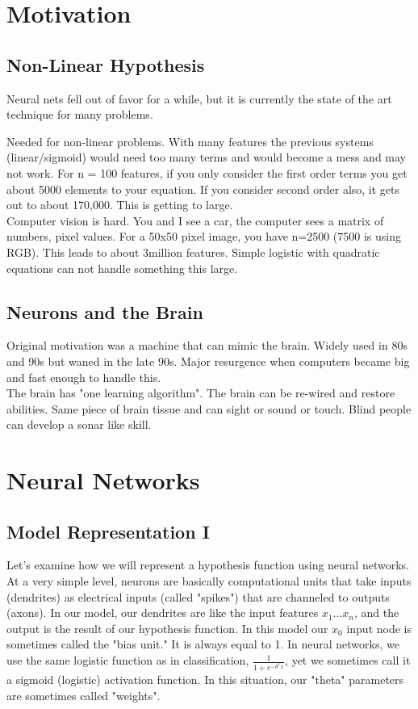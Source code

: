 \section{Motivation}

\subsection{Non-Linear Hypothesis}
Neural nets fell out of favor for a while, but it is currently the state of the art technique for many problems.

Needed for non-linear problems.  With many features the previous systems (linear/sigmoid) would need too many terms and would become a mess and may not work.  For n = 100 features, if you only consider the first order terms you get about 5000 elements to your equation.  If you consider second order also, it gets out to about 170,000.  This is getting to large.\\

Computer vision is hard.  You and I see a car, the computer sees a matrix of numbers, pixel values.  For a 50x50 pixel image, you have n=2500 (7500 is using RGB).  This leads to about 3million features.  Simple logistic with quadratic equations can not handle something this large.\\

\subsection{Neurons and the Brain}
Original motivation was a machine that can mimic the brain.  Widely used in 80s and 90s but waned in the late 90s.  Major resurgence when computers became big and fast enough to handle this.\\

The brain has "one learning algorithm".  The brain can be re-wired and restore abilities.  Same piece of brain tissue and can sight or sound or touch.  Blind people can develop a sonar like skill.


\section{Neural Networks}
\subsection{Model Representation I}
Let's examine how we will represent a hypothesis function using neural networks. At a very simple level, neurons are basically computational units that take inputs (dendrites) as electrical inputs (called "spikes") that are channeled to outputs (axons). In our model, our dendrites are like the input features $x_1 ... x_n$, and the output is the result of our hypothesis function. In this model our $x_0$  input node is sometimes called the "bias unit." It is always equal to 1. In neural networks, we use the same logistic function as in classification,  $\frac{1}{1+e^{-\theta^{T} x}}$, yet we sometimes call it a sigmoid (logistic) activation function. In this situation, our "theta" parameters are sometimes called "weights".\\

